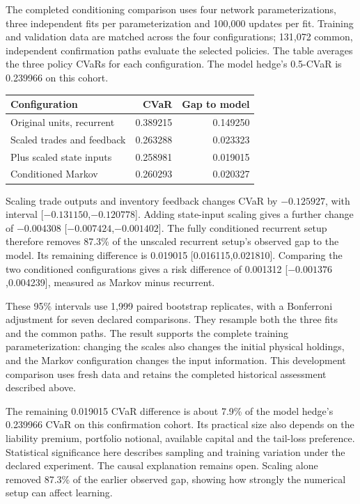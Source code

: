 \documentclass[8pt]{strategynet-journal}
\begin{document}
\begin{SNcolumns}
The completed conditioning comparison uses four network parameterizations,
three independent fits per parameterization and 100,000 updates per fit.
Training and validation data are matched across the four configurations;
131,072 common, independent confirmation paths evaluate the selected policies.
The table averages the three policy CVaRs for each configuration. The model
hedge's 0.5-CVaR is 0.239966 on this cohort.
\begin{center}
\begin{minipage}{\linewidth}
\centering
\normalsize
\begin{tabular}{@{}lrr@{}}
\toprule
Configuration & CVaR & Gap to model\\
\midrule
Original units, recurrent &0.389215&0.149250\\
Scaled trades and feedback &0.263288&0.023323\\
Plus scaled state inputs &0.258981&0.019015\\
Conditioned Markov &0.260293&0.020327\\
\bottomrule
\end{tabular}
\end{minipage}
\end{center}
Scaling trade outputs and inventory feedback changes CVaR by $-0.125927$,
with interval [$-0.131150$,$-0.120778$]. Adding state-input scaling gives a
further change of $-0.004308$ [$-0.007424$,$-0.001402$]. The fully conditioned
recurrent setup therefore removes 87.3\% of the unscaled recurrent setup's observed gap
to the model. Its remaining difference is 0.019015 [0.016115,0.021810].
Comparing the two conditioned configurations gives a risk difference of
0.001312 [$-0.001376$,0.004239], measured as Markov minus recurrent.

These 95\% intervals use 1,999 paired bootstrap replicates, with a Bonferroni
adjustment for seven declared comparisons. They resample both the three fits
and the common paths. The result supports the complete training
parameterization: changing the scales also changes the initial physical
holdings, and the Markov configuration changes the input information.
This development comparison uses fresh data and retains the completed
historical assessment described above.

The remaining 0.019015 CVaR difference is about 7.9\% of the model hedge's
0.239966 CVaR on this confirmation cohort. Its practical size also depends
on the liability premium, portfolio notional, available capital and the
tail-loss preference. Statistical significance here describes sampling and
training variation under the declared experiment. The causal explanation
remains open. Scaling alone removed 87.3\% of the earlier observed gap,
showing how strongly the numerical setup can affect learning.


\end{SNcolumns}
\end{document}
